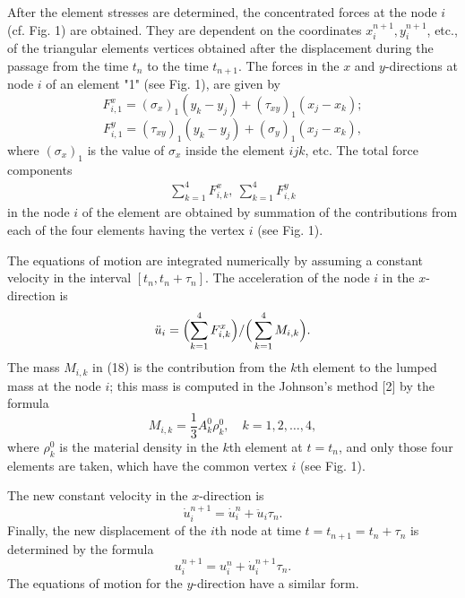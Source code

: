    After the element stresses are determined, the concentrated forces at the
node $i$ (cf. Fig. 1) are obtained. They are dependent on the coordinates
$x_i^{n+1},y_i^{n+1}$, etc., of the triangular elements vertices obtained
after the displacement during the passage from the time $t_n$ to the time
$t_{n+1}$. The forces in the $x$ and $y$-directions at node $i$ of an
element "1" (see Fig. 1), are given by
\begin{equation}
F_{i,1}^x = (\sigma_x)_1(y_k-y_j) + (\tau_{xy})_1(x_j-x_k);
\end{equation}
\begin{equation}
F_{i,1}^y = (\tau_{xy})_1(y_k-y_j) + (\sigma_y)_1(x_j-x_k),
\end{equation}
where $(\sigma_x)_1$ is the value of $\sigma_x$ inside the element $ijk$,
etc. The total force components
\begin{eqnarray}
\sum_{k=1}^4 F_{i,k}^x,~\sum_{k=1}^4 F_{i,k}^y
\end{eqnarray}
in the node $i$ of the element are obtained by summation of the contributions
from each of the four elements having the vertex $i$ (see Fig. 1).

   The equations of motion are integrated numerically by assuming a constant
velocity in the interval $[t_n,t_n+\tau_n]$. The acceleration of the node $i$
in the $x$-direction is
\begin{equation}
\ddot{u}_i = \Bigl(\sum_{k=1}^4 F_{i,k}^x\Bigr)/\Bigr(\sum_{k=1}^4 M_{i,k}
\Bigr).
\end{equation}
The mass $M_{i,k}$ in (18) is the contribution from the $k$th element to the
lumped mass at the node $i$; this mass is computed in the Johnson's method [2]
by the formula
\begin{equation}
M_{i,k} = \frac{1}{3}A_k^0\rho_k^0,\quad k=1,2,\ldots, 4,
\end{equation}
where $\rho_k^0$ is the material density in the $k$th element at $t=t_n$, and
only those four elements are taken, which have the common vertex $i$ (see Fig.
1).

   The new constant velocity in the $x$-direction is
\begin{equation}
\dot{u}_i^{n+1} = \dot{u}_i^n + \ddot{u}_i \tau_n.
\end{equation}
Finally, the new displacement of the $i$th node at time $t=t_{n+1} =t_n +
\tau_n$ is determined by the formula
\begin{equation}
u_i^{n+1}=u_i^n+\dot{u}_i^{n+1}\tau_n.
\end{equation}
The equations of motion for the $y$-direction have a similar form.

